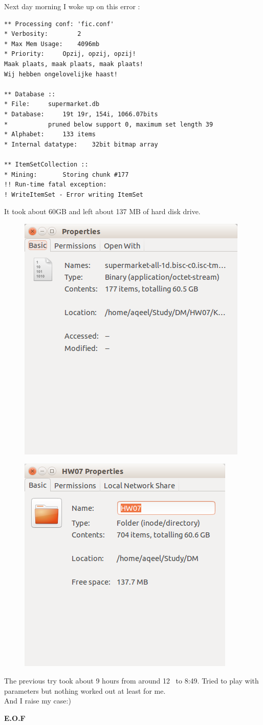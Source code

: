 \documentclass{article}
\begin{document}
Next day morning I woke up on this error :
\begin{lstlisting}
** Processing conf: 'fic.conf'
* Verbosity:		2
* Max Mem Usage:	4096mb
* Priority:		Opzij, opzij, opzij!
Maak plaats, maak plaats, maak plaats!
Wij hebben ongelovelijke haast!

** Database :: 
* File:		supermarket.db
* Database:		19t 19r, 154i, 1066.07bits
* 			pruned below support 0, maximum set length 39
* Alphabet:		133 items
* Internal datatype:	32bit bitmap array

** ItemSetCollection ::
* Mining:		Storing chunk #177             
!! Run-time fatal exception:
! WriteItemSet - Error writing ItemSet
\end{lstlisting}
It took about 60GB and left about 137 MB of hard disk drive.
\begin{figure}[H]
\includegraphics[scale=1]{size.png}
\end{figure}
\begin{figure}[H]
	\includegraphics[scale=1]{space.png}
\end{figure}
The previous try took about 9 hours from around 12~ to 8:49.
Tried to play with parameters but nothing worked out at least for me.\\ And I raise my case:)\\
\begin{center}
\textbf{E.O.F}
\end{center}
\end{document}
